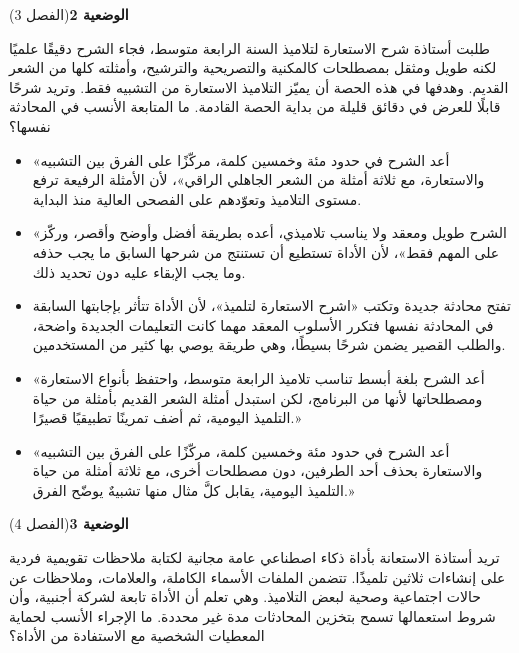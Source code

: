 \documentclass[11pt,a4paper]{article}
\begin{document}
\par\vspace{6pt}
\noindent
{\large\khatt\textbf{الوضعية 2}}\hfill{\small(الفصل 3)}\par\nopagebreak\vspace{3pt}
\setlength{\fboxsep}{7pt}\colorbox{gray!10}{\parbox{\dimexpr\linewidth-14pt}{طلبت أستاذة شرح الاستعارة لتلاميذ السنة الرابعة متوسط، فجاء الشرح دقيقًا علميًا لكنه طويل ومثقل بمصطلحات كالمكنية والتصريحية والترشيح، وأمثلته كلها من الشعر القديم. وهدفها في هذه الحصة أن يميّز التلاميذ الاستعارة من التشبيه فقط. وتريد شرحًا قابلًا للعرض في دقائق قليلة من بداية الحصة القادمة. ما المتابعة الأنسب في المحادثة نفسها؟}}\par\nopagebreak
\begin{itemize}[leftmargin=1.0cm, labelsep=6pt, itemsep=3pt, topsep=4pt, parsep=0pt]
  \item[\textbf{أ)}] «أعد الشرح في حدود مئة وخمسين كلمة، مركّزًا على الفرق بين التشبيه والاستعارة، مع ثلاثة أمثلة من الشعر الجاهلي الراقي»، لأن الأمثلة الرفيعة ترفع مستوى التلاميذ وتعوّدهم على الفصحى العالية منذ البداية.
  \item[\textbf{ب)}] «الشرح طويل ومعقد ولا يناسب تلاميذي، أعده بطريقة أفضل وأوضح وأقصر، وركّز على المهم فقط»، لأن الأداة تستطيع أن تستنتج من شرحها السابق ما يجب حذفه وما يجب الإبقاء عليه دون تحديد ذلك.
  \item[\textbf{ج)}] تفتح محادثة جديدة وتكتب «اشرح الاستعارة لتلميذ»، لأن الأداة تتأثر بإجابتها السابقة في المحادثة نفسها فتكرر الأسلوب المعقد مهما كانت التعليمات الجديدة واضحة، والطلب القصير يضمن شرحًا بسيطًا، وهي طريقة يوصي بها كثير من المستخدمين.
  \item[\textbf{د)}] «أعد الشرح بلغة أبسط تناسب تلاميذ الرابعة متوسط، واحتفظ بأنواع الاستعارة ومصطلحاتها لأنها من البرنامج، لكن استبدل أمثلة الشعر القديم بأمثلة من حياة التلميذ اليومية، ثم أضف تمرينًا تطبيقيًا قصيرًا.»
  \item[\textbf{هـ)}] «أعد الشرح في حدود مئة وخمسين كلمة، مركّزًا على الفرق بين التشبيه والاستعارة بحذف أحد الطرفين، دون مصطلحات أخرى، مع ثلاثة أمثلة من حياة التلميذ اليومية، يقابل كلَّ مثال منها تشبيهٌ يوضّح الفرق.»
\end{itemize}
\par\vspace{6pt}
\noindent
{\large\khatt\textbf{الوضعية 3}}\hfill{\small(الفصل 4)}\par\nopagebreak\vspace{3pt}
\setlength{\fboxsep}{7pt}\colorbox{gray!10}{\parbox{\dimexpr\linewidth-14pt}{تريد أستاذة الاستعانة بأداة ذكاء اصطناعي عامة مجانية لكتابة ملاحظات تقويمية فردية على إنشاءات ثلاثين تلميذًا. تتضمن الملفات الأسماء الكاملة، والعلامات، وملاحظات عن حالات اجتماعية وصحية لبعض التلاميذ. وهي تعلم أن الأداة تابعة لشركة أجنبية، وأن شروط استعمالها تسمح بتخزين المحادثات مدة غير محددة. ما الإجراء الأنسب لحماية المعطيات الشخصية مع الاستفادة من الأداة؟}}\par\nopagebreak
\end{document}
